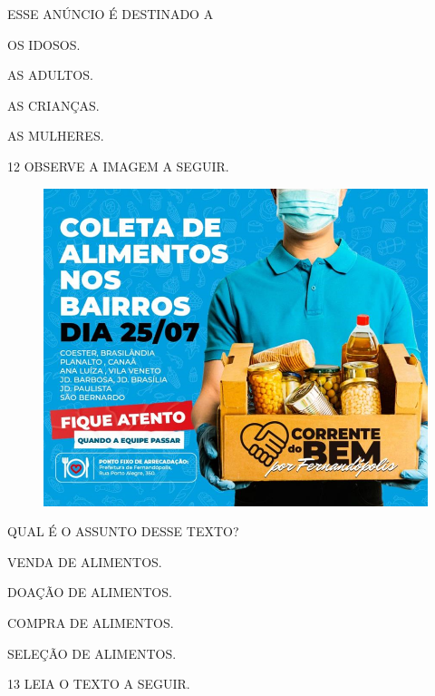 ESSE ANÚNCIO É DESTINADO A

\begin{escolha}

\item OS IDOSOS.

\item AS ADULTOS.

\item AS CRIANÇAS.

\item AS MULHERES.

\end{escolha}

\num{12} OBSERVE A IMAGEM A SEGUIR.

\begin{figure}[H]
\centering
\includegraphics[width=.8\textwidth]{./media/image236.png}
\end{figure}

QUAL É O ASSUNTO DESSE TEXTO?

\begin{escolha}

\item VENDA DE ALIMENTOS.

\item DOAÇÃO DE ALIMENTOS.

\item COMPRA DE ALIMENTOS.

\item SELEÇÃO DE ALIMENTOS.

\end{escolha}

\pagebreak
\num{13} LEIA O TEXTO A SEGUIR.

